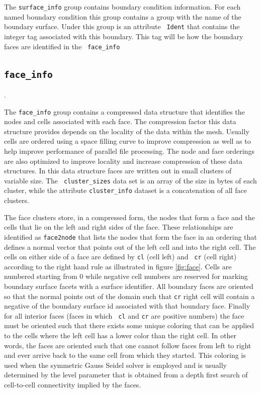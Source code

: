 \documentclass{article}
\begin{document}
The {\tt surface\_info} group contains boundary condition information.
For each named boundary condition this group contains a group with the
name of the boundary surface. Under this group is an attribute {\tt
  Ident} that contains the integer tag associated with this boundary.
This tag will be how the boundary faces are identified in the {\tt
  face\_info}

\subsection{\tt face\_info}.

The {\tt face\_info} group contains a compressed data structure that
identifies the nodes and cells associated with each face.  The
compression factor this data structure provides depends on the
locality of the data within the mesh.  Usually cells are ordered using
a space filling curve to improve compression as well as to help
improve performance of parallel file processing.  The node and face
orderings are also optimized to improve locality and increase
compression of these data structures.  In this data structure faces
are written out in small clusters of variable size.  The {\tt
  cluster\_sizes} data set is an array of the size in bytes of each
cluster, while the attribute {\tt cluster\_info} dataset is a
concatenation of all face clusters.

The face clusters store, in a compressed form, the nodes that form a
face and the cells that lie on the left and right sides of the face.
These relationships are identified as {\tt face2node} that lists the
nodes that form the face in an ordering that defines a normal vector
that points out of the left cell and into the right cell.  The cells
on either side of a face are defined by {\tt cl} (cell left) and {\tt
  cr} (cell right) according to the right hand rule as illustrated in
figure \ref{fig:face}.  Cells are numbered starting from $0$ while
negative cell numbers are reserved for marking boundary surface facets
with a surface identifier.  All boundary faces are oriented so that
the normal points out of the domain such that {\tt cr} right cell will
contain a negative of the boundary surface id associated with that
boundary face.  Finally for all interior faces (faces in which {\tt
  cl} and {\tt cr} are positive numbers) the face must be oriented
such that there exists some unique coloring that can be applied to the
cells where the left cell has a lower color than the right cell.  In
other words, the faces are oriented such that one cannot follow faces
from left to right and ever arrive back to the same cell from which
they started.  This coloring is used when the symmetric Gauss Seidel
solver is employed and is usually determined by the level parameter
that is obtained from a depth first search of cell-to-cell
connectivity implied by the faces.
\end{document}
